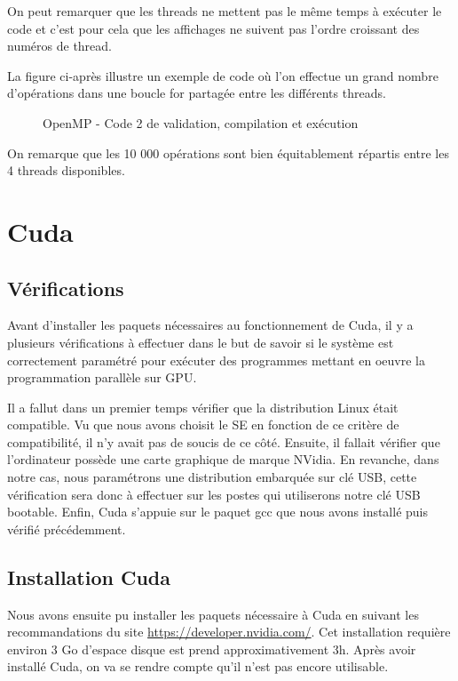 \documentclass[final]{polytech/polytech}
\begin{document}
On peut remarquer que les threads ne mettent pas le même temps à exécuter le code et c'est pour cela que les affichages ne suivent pas l'ordre croissant des numéros de thread.

La figure ci-après illustre un exemple de code où l'on effectue un grand nombre d'opérations dans une boucle for partagée entre les différents threads.

\vfill\eject

\begin{figure}
\caption{OpenMP - Code 2 de validation, compilation et exécution}
\label{fig:openmp_test}
\end{figure}

On remarque que les 10 000 opérations sont bien équitablement répartis entre les 4 threads disponibles.

\section{Cuda}

\subsection{Vérifications}
Avant d'installer les paquets nécessaires au fonctionnement de Cuda, il y a plusieurs vérifications à effectuer dans le but de savoir si le système est correctement paramétré pour exécuter des programmes mettant en oeuvre la programmation parallèle sur GPU.

Il a fallut dans un premier temps vérifier que la distribution Linux était compatible. Vu que nous avons choisit le SE en fonction de ce critère de compatibilité, il n'y avait pas de soucis de ce côté. Ensuite, il fallait vérifier que l'ordinateur possède une carte graphique de marque NVidia. En revanche, dans notre cas, nous paramétrons une distribution embarquée sur clé USB, cette vérification sera donc à effectuer sur les postes qui utiliserons notre clé USB bootable. Enfin, Cuda s'appuie sur le paquet gcc que nous avons installé puis vérifié précédemment.

\subsection{Installation Cuda}
Nous avons ensuite pu installer les paquets nécessaire à Cuda en suivant les recommandations du site \url{https://developer.nvidia.com/}. Cet installation requière environ 3 Go d'espace disque est prend approximativement 3h. Après avoir installé Cuda, on va se rendre compte qu'il n'est pas encore utilisable.
\end{document}
